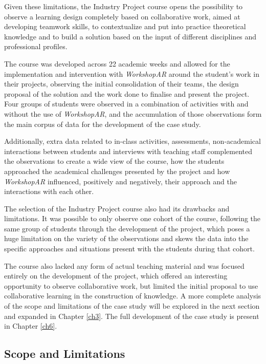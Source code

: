 Given these limitations, the Industry Project course opens the possibility to observe a learning design completely based on collaborative work, aimed at developing teamwork skills,
to contextualize and put into practice theoretical knowledge and to build a solution based on the input of different disciplines and professional profiles.

The course was developed across 22 academic weeks and allowed for the implementation and intervention with \emph{WorkshopAR} around the student's work in their projects, observing
the initial consolidation of their teams, the design proposal of the solution and the work done to finalise and present the project. Four groups of students were observed in a
combination of activities with and without the use of \emph{WorkshopAR}, and the accumulation of those observations form the main corpus of data for the development of the case study.

Additionally, extra data related to in-class activities, assessments, non-academical interactions between students and interviews with teaching staff complemented the observations
to create a wide view of the course, how the students approached the academical challenges presented by the project and how \emph{WorkshopAR} influenced, positively and negatively,
their approach and the interactions with each other.

The selection of the Industry Project course also had its drawbacks and limitations. It was possible to only observe one cohort of the course, following the same group of students
through the development of the project, which poses a huge limitation on the variety of the observations and skews the data into the specific approaches and situations present with
the students during that cohort.

The course also lacked any form of actual teaching material and was focused entirely on the development of the project, which offered an interesting opportunity to observe collaborative
work, but limited the initial proposal to use collaborative learning in the construction of knowledge. A more complete analysis of the scope and limitations of the case study will
be explored in the next section and expanded in Chapter \ref{ch3}. The full development of the case study is present in Chapter \ref{ch6}.

\subsection{Scope and Limitations \label{sec:1-2-3}}

